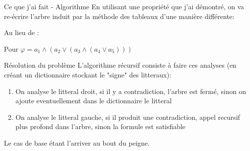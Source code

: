 \documentclass[]{beamer}
\begin{document}
\begin{frame}{Ce que j'ai fait - Algorithme}
    En utilisant une propriété que j'ai démontré, on va re-écrire l'arbre induit par la méthode des tableaux d'une manière différente:

    Au lieu de :

    Pour $\varphi = a_1\land(a_2\lor(a_3\land(a_4\lor a_5)))$
\end{frame}

\begin{frame}{Résolution du problème}
    L'algorithme récursif consiste à faire ces analyses (en créant un dictionnaire stockant le "signe" des litteraux):
    \begin{enumerate}
        \item On analyse le litteral droit, si il y a contradiction, l'arbre est fermé, sinon on ajoute eventuellement dans le dictionnaire le litteral
        \item On analyse le litteral gauche, si il produit une contradiction, appel recursif plus profond dans l'arbre, sinon la formule est satisfiable
    \end{enumerate}
    Le cas de base étant l'arriver au bout du peigne.
\end{frame}
\end{document}
